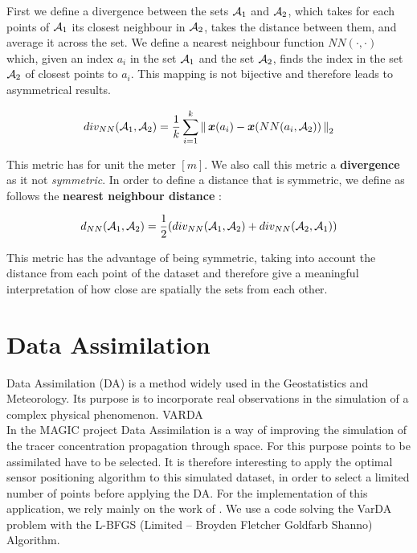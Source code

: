 First we define a divergence between the sets $\mathcal{A}_1$ and $\mathcal{A}_2$, which takes for each points of $\mathcal{A}_1$ its closest neighbour in $\mathcal{A}_2$, takes the distance between them, and average it across the set. We define a nearest neighbour function $NN(\cdot,\cdot)$ which, given an index $a_i$ in the set $\mathcal{A}_1$ and the set $\mathcal{A}_2$, finds the index in the set $\mathcal{A}_2$ of closest points to $a_i$. This mapping is not bijective and therefore leads to asymmetrical results. 

\begin{equation}
	div_{NN}(\mathcal{A}_1,\mathcal{A}_2) = \frac{1}{k}\sum_{i=1}^k \left \lVert \,{\boldsymbol{{x}}}(a_i) - {\boldsymbol{{x}}}(NN(a_i,\mathcal{A}_2))\, \right \rVert_2
\end{equation}

This metric has for unit the meter $[m]$. We also call this metric a \textbf{divergence} as it not \textit{symmetric}. In order to define a distance that is symmetric, we define as follows the \textbf{nearest neighbour distance} :

\begin{equation}
	d_{NN}(\mathcal{A}_1,\mathcal{A}_2) = \frac{1}{2} (div_{NN}(\mathcal{A}_1,\mathcal{A}_2) + div_{NN}(\mathcal{A}_2,\mathcal{A}_1))
	\label{equ:distNN}
\end{equation}

This metric has the advantage of being symmetric, taking into account the distance from each point of the dataset and therefore give a meaningful interpretation of how close are spatially the sets from each other. 
%





\section{Data Assimilation}

Data Assimilation (DA) is a method widely used in the Geostatistics and Meteorology. Its purpose is to incorporate real observations in the simulation of a complex physical phenomenon. VARDA\\

In the MAGIC project Data Assimilation is a way of improving the simulation of the tracer concentration propagation through space. For this purpose points to be assimilated have to be selected. It is therefore interesting to apply the optimal sensor positioning algorithm to this simulated dataset, in order to select a limited  number of points before applying the DA. For the implementation of this application, we rely mainly on the work of \citet{arcucci_optimal_2019}. We use a code solving the VarDA problem with the L-BFGS (Limited – Broyden Fletcher Goldfarb Shanno) Algorithm. \\

